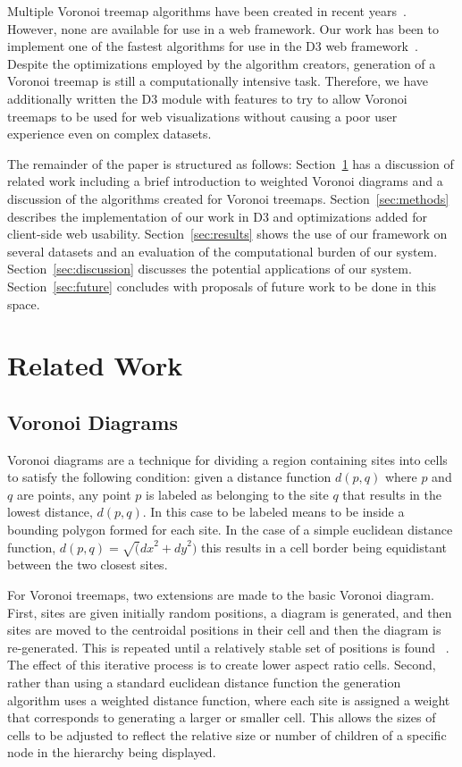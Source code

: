 \documentclass{acm_proc_article-sp} \usepackage{cite}
\begin{document}
Multiple Voronoi treemap algorithms have been created in recent 
years~\cite{balzer:treemaps, sud:fast, nocaj:faster}. However,
none are available for use in a web framework.  Our work has been to
implement one of the fastest algorithms for use in the D3 web
framework~\cite{Bostock2011}. Despite the optimizations employed by the algorithm
creators, generation of a Voronoi treemap is still a computationally
intensive task. Therefore, we have additionally written the D3 module
with features to try to allow Voronoi treemaps to be used for web
visualizations without causing a poor user experience even on complex
datasets.

The remainder of the paper is structured as follows: Section~\ref{sec:related} has a
discussion of related work including a brief introduction to weighted
Voronoi diagrams and a discussion of the algorithms created for
Voronoi treemaps. Section~\ref{sec:methods} describes the implementation of our work
in D3 and optimizations added for client-side web usability. Section~\ref{sec:results}
shows the use of our framework on several datasets and an evaluation
of the computational burden of our system. Section~\ref{sec:discussion} discusses the
potential applications of our system. Section~\ref{sec:future} concludes with
proposals of future work to be done in this space.

\section{Related Work}
\label{sec:related}

\subsection{Voronoi Diagrams}
Voronoi diagrams are a technique for dividing a region containing
sites into cells to satisfy the following condition: given a distance
function $d(p, q)$ where $p$ and $q$ are points, any point $p$ is
labeled as belonging to the site $q$ that results in the lowest
distance, $d(p,q)$. In this case to be labeled means to be inside a
bounding polygon formed for each site. In the case of a simple
euclidean distance function, $d(p,q) = \sqrt({dx}^2 + {dy}^2)$ this
results in a cell border being equidistant between the two closest
sites.

For Voronoi treemaps, two extensions are made to the basic Voronoi
diagram. First, sites are given initially random positions, a diagram
is generated, and then sites are moved to the centroidal positions in
their cell and then the diagram is re-generated. This is repeated
until a relatively stable set of positions is found ~\cite{lloyd}. The
effect of this iterative process is to create lower aspect ratio
cells. Second, rather than using a standard euclidean distance
function the generation algorithm uses a weighted distance function,
where each site is assigned a weight that corresponds to generating a
larger or smaller cell. This allows the sizes of cells to be adjusted
to reflect the relative size or number of children of a specific node
in the hierarchy being displayed.
\end{document}
